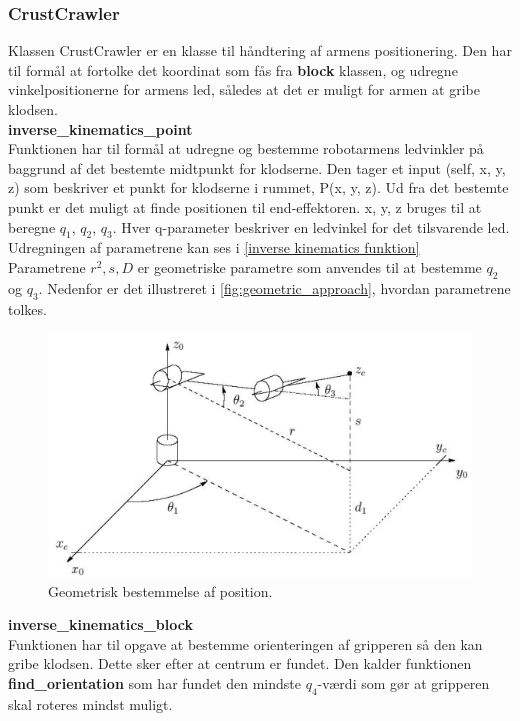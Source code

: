 \subsubsection{CrustCrawler}
\label{subsub: CrustCrawler}

Klassen CrustCrawler er en klasse til håndtering af armens positionering. Den har til formål at fortolke det koordinat som fås fra \textbf{block} klassen, og udregne vinkelpositionerne for armens led, således at det er muligt for armen at gribe klodsen.\\

\textbf{inverse\_kinematics\_point}\\
Funktionen har til formål at udregne og bestemme robotarmens ledvinkler på baggrund af det bestemte midtpunkt for klodserne. Den tager et input (self, x, y, z) som beskriver et punkt for klodserne i rummet, P(x, y, z). Ud fra det bestemte punkt er det muligt at finde positionen til end-effektoren. x, y, z bruges til at beregne $q_1$, $q_2$, $q_3$. Hver q-parameter beskriver en ledvinkel for det tilsvarende led. Udregningen af parametrene kan ses i \autoref{inverse kinematics funktion}\\

Parametrene $r^2, s, D$ er geometriske parametre som anvendes til at bestemme $q_2$ og $q_3$. Nedenfor er det illustreret i \autoref{fig:geometric_approach}, hvordan parametrene tolkes.\\

\begin{figure}[h]
\centering
\includegraphics[scale=0.4]{images/geometric_approach}
\caption{Geometrisk bestemmelse af position.}
\label{fig:geometric_approach}
\end{figure}

\newpage
\textbf{inverse\_kinematics\_block}\\
Funktionen har til opgave at bestemme orienteringen af gripperen så den kan gribe klodsen. Dette sker efter at centrum er fundet. Den kalder funktionen \textbf{find\_orientation} som har fundet den mindste $q_4$-værdi som gør at gripperen skal roteres mindst muligt.

